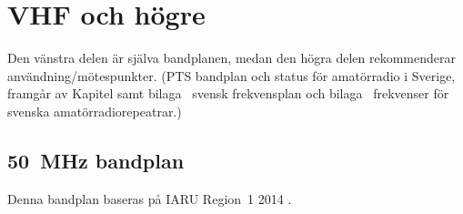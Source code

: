 \onecolumn

\section{VHF och högre}
\label{Bandplan VHF och högre}

Den vänstra delen är själva bandplanen, medan den högra delen rekommenderar
användning/mötespunkter.
(PTS bandplan och status för amatörradio i Sverige, framgår av Kapitel
 samt bilaga~ svensk frekvensplan och
bilaga~ frekvenser för svenska amatörradiorepeatrar.)

\subsection{\qty{50}{\mega\hertz} bandplan}
\label{50MHZbandplan}
Denna bandplan baseras på IARU Region~1 2014 \cite{IARU1}.

